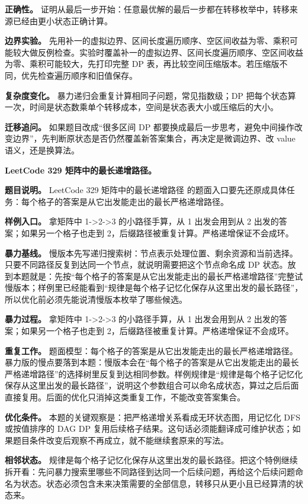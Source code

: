 \textbf{正确性。} 证明从最后一步开始：任意最优解的最后一步都在转移枚举中，转移来源已经由更小状态正确计算。

\textbf{边界实验。} 先用补一的虚拟边界、区间长度遍历顺序、空区间收益为零、乘积可能较大做反例检查。实验时覆盖补一的虚拟边界、区间长度遍历顺序、空区间收益为零、乘积可能较大，先打印完整 DP 表，再比较空间压缩版本。若压缩版不同，优先检查遍历顺序和旧值保存。

\textbf{复杂度变化。} 暴力递归会重复计算相同子问题，常见指数级；DP 把每个状态算一次，时间是状态数乘单个转移成本，空间是状态表大小或压缩后的大小。

\textbf{迁移追问。} 如果题目改成“很多区间 DP 都要换成最后一步思考，避免中间操作改变边界”，先判断原状态是否仍然覆盖新答案集合，再决定是微调边界、改 value 语义，还是换算法。

\noindent\textbf{LeetCode 329 矩阵中的最长递增路径。}

\textbf{题目说明。} LeetCode 329 矩阵中的最长递增路径 的题面入口要先还原成具体任务：每个格子的答案是从它出发能走出的最长严格递增路径。

\textbf{样例入口。} 拿矩阵中 1->2->3 的小路径手算，从 1 出发会用到从 2 出发的答案；如果另一个格子也走到 2，后缀路径被重复计算。严格递增保证不会成环。

\textbf{暴力基线。} 慢版本先写递归搜索树：节点表示处理位置、剩余资源和当前选择。只要不同路径反复到达同一个节点，就说明需要把这个节点命名成 DP 状态。放到本题就是：先按“每个格子的答案是从它出发能走出的最长严格递增路径”完整试慢版本；样例里已经能看到“规律是每个格子记忆化保存从这里出发的最长路径”，所以优化前必须先能说清慢版本枚举了哪些候选。

\textbf{暴力过程。} 拿矩阵中 1->2->3 的小路径手算，从 1 出发会用到从 2 出发的答案；如果另一个格子也走到 2，后缀路径被重复计算。严格递增保证不会成环。

\textbf{重复工作。} 题面模型：每个格子的答案是从它出发能走出的最长严格递增路径。暴力版的慢点要落到本题：慢版本会在“每个格子的答案是从它出发能走出的最长严格递增路径”的选择树里反复到达相同参数。样例规律是“规律是每个格子记忆化保存从这里出发的最长路径”，说明这个参数组合可以命名成状态，算过之后后面直接复用。后面的优化只消掉这类重复工作，不能改变答案集合。

\textbf{优化条件。} 本题的关键观察是：把严格递增关系看成无环状态图，用记忆化 DFS 或按值排序的 DAG DP 复用后续格子结果。这句话必须能翻译成可维护状态；如果题目条件改变后观察不再成立，就不能继续套原来的写法。

\textbf{相邻状态。} 规律是每个格子记忆化保存从这里出发的最长路径。把这个特例继续拆开看：先问暴力搜索里哪些不同路径到达同一个后续问题，再给这个后续问题命名为状态。状态必须包含未来决策需要的全部信息，转移只从更小且已经算清的状态来。

